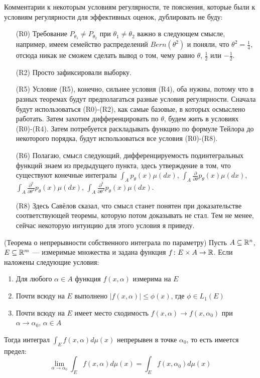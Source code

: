 \begin{note}
    Комментарии к некоторым условиям регулярности, те пояснения, которые были к условиям регулярности для эффективных оценок, дублировать не буду:
    \begin{itemize}
        \item[(R0)] Требование $P_{\theta_1} \neq P_{\theta_2}$ при $\theta_1 \neq \theta_2$ важно в следующем смысле, например, имеем семейство распределений $Bern(\theta^2)$ и поняли, что $\theta^2 = \frac{1}{4}$, отсюда никак не сможем сделать вывод о том, чему равно $\theta$, $\frac{1}{2}$ или $-\frac{1}{2}$.

        \item[(R2)] Просто зафиксировали выборку.

        \item[(R5)] Условие (R5), конечно, сильнее условия (R4), оба нужны, потому что в разных теоремах будут предполагаться разные условия регулярности. Сначала будут использоваться (R0)-(R2), как самые базовые, в которых осмыслено работать. Затем захотим дифференцировать по $\theta$, будем жить в условиях (R0)-(R4). Затем потребуется раскладывать функцию по формуле Тейлора до некоторого порядка, будут использоваться все условия (R0)-(R8).

        \item[(R6)] Полагаю, смысл следующий, дифференцируемость подинтегральных функций знаем из предыдущего пункта, здесь утверждение в том, что существуют конечные интегралы $\int_A p_\theta(x) \mu(dx)$, $\int_A \frac{\partial}{\partial \theta} p_\theta(x) \mu(dx)$, $\int_A \frac{\partial^2}{\partial \theta^2} p_\theta(x) \mu(dx)$, $\int_A \frac{\partial^3}{\partial \theta^3} p_\theta(x) \mu(dx)$.

        \item[(R8)] Здесь Савёлов сказал, что смысл станет понятен при доказательстве соответствующей теоремы, которую потом доказывать не стал. Тем не менее, сейчас некоторую интуицию для этого условия я приведу.
    \end{itemize}    
\end{note}

\begin{reminder} (Теорема о непрерывности собственного интеграла по параметру)
	Пусть $A \subseteq \mathbb{R}^n$, $E \subseteq \mathbb{R}^m$ --- измеримые множества и задана функция $f \colon E \times A \to \mathbb{R}$. Если наложены следующие условия:
	\begin{enumerate}
		\item Для любого $\alpha \in A$ функция $f(x, \alpha)$ измерима на $E$
		
		\item Почти всюду на $E$ выполнено $|f(x, \alpha)| \le \phi(x)$, где $\phi \in L_1(E)$
		
		\item Почти всюду на $E$ имеет место сходимость $f(x, \alpha) \to f(x, \alpha_0)$ при $\alpha \to \alpha_0$, $\alpha \in A$
	\end{enumerate}
	Тогда интеграл $\int_E f(x, \alpha)d\mu(x)$ непрерывен в точке $\alpha_0$, то есть имеется предел:
	\[
		\lim_{\alpha \to \alpha_0} \int_E f(x, \alpha)d\mu(x) = \int_E f(x, \alpha_0)d\mu(x)
	\]
\end{reminder}

